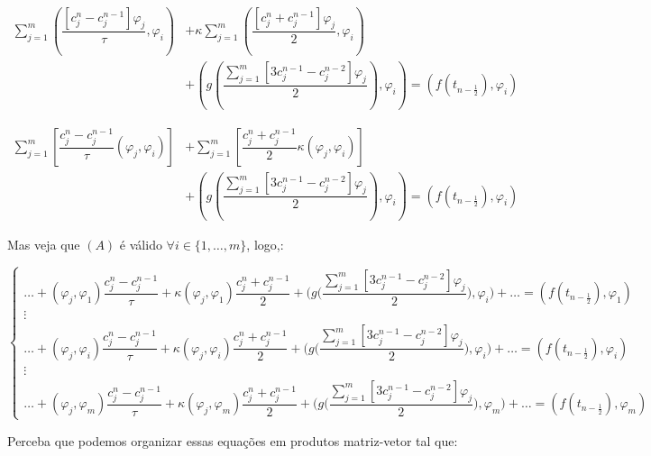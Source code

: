   \begin{align*}
    \sum_{j=1}^{m}\left( \dfrac{[c_j^n - c_j^{n-1}] \varphi_j}{\tau}, \varphi_i\right) &+ \kappa\sum_{j=1}^{m}\left( \dfrac{[c_j^n + c_j^{n-1}] \varphi_j}{2}, \varphi_i\right) \\
    &+ \left(g\left(\dfrac{\sum_{j=1}^{m}[3c_j^{n-1} - c_j^{n-2}]\varphi_j}{2}\right), \varphi_i\right) = (f(t_{n - \frac{1}{2}}), \varphi_i)
  \end{align*}

  \begin{align*}
    \sum_{j=1}^{m}\left[ \dfrac{c_j^n - c_j^{n-1}}{\tau} (\varphi_j, \varphi_i)\right] &+ \sum_{j=1}^{m}\left[ \dfrac{c_j^n + c_j^{n-1}}{2} \kappa(\varphi_j, \varphi_i) \right] \\
    &+ \left(g\left(\dfrac{\sum_{j=1}^{m}[3c_j^{n-1} - c_j^{n-2}]\varphi_j}{2}\right), \varphi_i\right) = (f(t_{n - \frac{1}{2}}), \varphi_i)
  \end{align*}

  Mas veja que $(A)$ é válido $\forall i \in \{1,\dots,m\}$, logo,:

  \begin{center}
    \[\begin{cases}
       \dots + (\varphi_j, \varphi_1)\dfrac{c_j^n - c_j^{n-1}}{\tau}  + \kappa(\varphi_j, \varphi_1)\dfrac{c_j^n + c_j^{n-1}}{2} + \Biggl(g\Biggl(\dfrac{\sum_{j=1}^{m}[3c_j^{n-1} - c_j^{n-2}]\varphi_j}{2}\Biggr), \varphi_i\Biggr) + \dots = (f(t_{n - \frac{1}{2}}), \varphi_1)\\
      \vdots \\
      \dots + (\varphi_j, \varphi_i)\dfrac{c_j^n - c_j^{n-1}}{\tau}  + \kappa(\varphi_j, \varphi_i)\dfrac{c_j^n + c_j^{n-1}}{2} + \Biggl(g\Biggl(\dfrac{\sum_{j=1}^{m}[3c_j^{n-1} - c_j^{n-2}]\varphi_j}{2}\Biggr), \varphi_i\Biggr) + \dots = (f(t_{n - \frac{1}{2}}), \varphi_i)\\
      \vdots \\
      \dots + (\varphi_j, \varphi_m)\dfrac{c_j^n - c_j^{n-1}}{\tau}  + \kappa(\varphi_j, \varphi_m)\dfrac{c_j^n + c_j^{n-1}}{2} + \Biggl(g\Biggl(\dfrac{\sum_{j=1}^{m}[3c_j^{n-1} - c_j^{n-2}]\varphi_j}{2}\Biggr), \varphi_m\Biggr) + \dots = (f(t_{n - \frac{1}{2}}), \varphi_m)
    \end{cases}\]
  \end{center}

  Perceba que podemos organizar essas equações em produtos matriz-vetor tal que:

